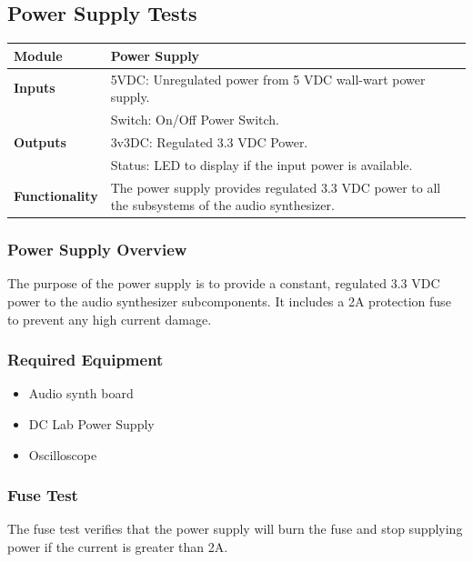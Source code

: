 \documentclass{article}
\begin{document}
\subsection{Power Supply Tests}

\begin{tabular}{|p{1in}|p{5in}|}
\hline
\textbf{Module} & Power Supply \\
\hline
\textbf{Inputs}& 5VDC: Unregulated power from 5 VDC wall-wart power supply.\\
	     & Switch: On/Off Power Switch.\\
\hline
\textbf{Outputs}& 3v3DC: Regulated 3.3 VDC Power.\\
	      & Status: LED to display if the input power is available.\\ 
\hline
\textbf{Functionality}& The power supply provides regulated 3.3 VDC power to all the subsystems of the audio synthesizer.\\
\hline
\end{tabular}

\subsubsection{Power Supply Overview}
The purpose of the power supply is to provide a constant, regulated 3.3 VDC power to the audio synthesizer subcomponents.  It includes a 2A protection fuse to prevent any high current damage.
\subsubsection{Required Equipment}
\begin{itemize}
\item Audio synth board
\item DC Lab Power Supply
\item Oscilloscope
\end{itemize}
\subsubsection{Fuse Test}
The fuse test verifies that the power supply will burn the fuse and stop supplying power if the current is greater than 2A.  
\end{document}
